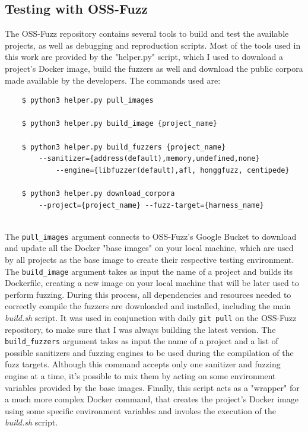 \subsection{Testing with OSS-Fuzz}
The OSS-Fuzz repository contains several tools to build and test the available projects, as well as debugging and reproduction scripts.
\newline
Most of the tools used in this work are provided by the "helper.py" script, which I used to download a project's Docker image, build the fuzzers as well and download the public corpora made available by the developers.
\newline \newline
The commands used are:
\begin{verbatim}
    $ python3 helper.py pull_images 

    $ python3 helper.py build_image {project_name}

    $ python3 helper.py build_fuzzers {project_name}
        --sanitizer={address(default),memory,undefined,none} 
            --engine={libfuzzer(default),afl, honggfuzz, centipede}
        
    $ python3 helper.py download_corpora 
        --project={project_name} --fuzz-target={harness_name}
\end{verbatim}
\ \\
The \verb|pull_images| argument connects to OSS-Fuzz's Google Bucket to download and update all the Docker "base images" on your local machine, which are used by all projects as the base image to create their respective testing environment.
\newline \newline
The \verb|build_image| argument takes as input the name of a project and builds its Dockerfile, creating a new image on your local machine that will be later used to perform fuzzing. During this process, all dependencies and resources needed to correctly compile the fuzzers are downloaded and installed, including the main \textit{build.sh} script. It was used in conjunction with daily \verb|git pull| on the OSS-Fuzz repository, to make sure that I was always building the latest version. 
\newline \newline
The \verb|build_fuzzers| argument takes as input the name of a project and a list of possible sanitizers and fuzzing engines to be used during the compilation of the fuzz targets. Although this command accepts only one sanitizer and fuzzing engine at a time, it's possible to mix them by acting on some environment variables provided by the base images. Finally, this script acts as a "wrapper" for a much more complex Docker command, that creates the project's Docker image using some specific environment variables and invokes the execution of the \textit{build.sh} script.
